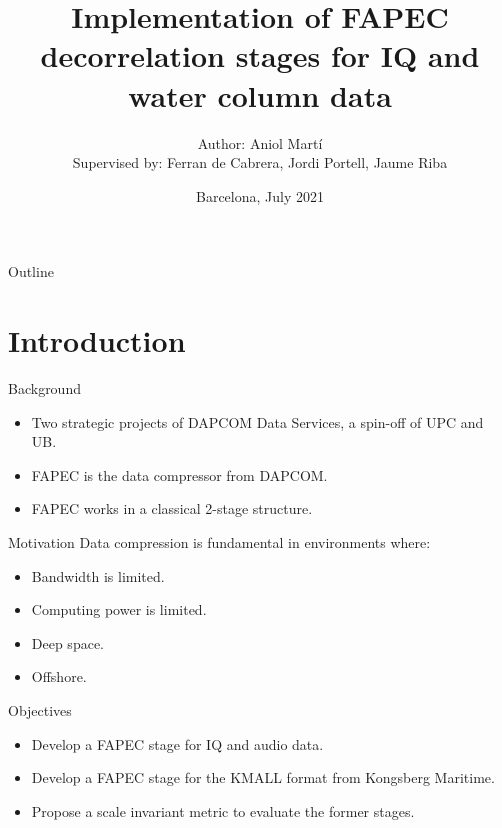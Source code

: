 \documentclass[usenames,dvipsnames]{beamer}
\title[FAPEC]{Implementation of FAPEC decorrelation stages for IQ and water column data}
\date[July 2021]{Barcelona, July 2021}
\author[Aniol Martí]{
  Author: Aniol Martí\\
  Supervised by: Ferran de Cabrera, Jordi Portell, Jaume Riba
}
\institute{Universitat Politècnica de Catalunya}
\begin{document}
\begin{frame}
\titlepage
\end{frame}

\begin{frame}{Outline}
\tableofcontents
\end{frame}


\section{Introduction}
\begin{frame}{Background}
\begin{itemize}
	\item Two strategic projects of DAPCOM Data Services, a spin-off of UPC and UB.
	\item FAPEC is the data compressor from DAPCOM.
	\item<2> FAPEC works in a classical 2-stage structure.
\end{itemize}
\vspace{1.5em}
\centering
{}\scalebox{.515}{}
\end{frame}

\begin{frame}{Motivation}
Data compression is fundamental in environments where:
\begin{itemize}
	\item<1-> Bandwidth is limited.
	\item<1-> Computing power is limited.
\end{itemize}
\vspace{1em}

\begin{itemize}
	\item<2-> Deep space.
	\item<2-> Offshore.
\end{itemize}
\end{frame}

\begin{frame}{Objectives}
\begin{itemize}
	\item Develop a FAPEC stage for IQ and audio data.
	\item Develop a FAPEC stage for the KMALL format from Kongsberg Maritime.
	\item Propose a scale invariant metric to evaluate the former stages. 
\end{itemize}
\end{frame}
\end{document}
